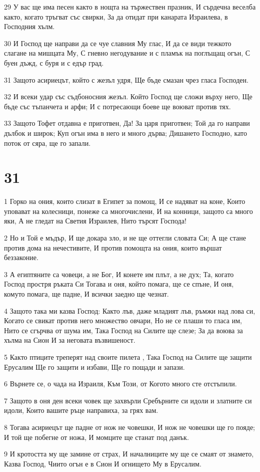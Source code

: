\par 29 У вас ще има песен както в нощта на тържествен празник, И сърдечна веселба както, когато тръгват със свирки, За да отидат при канарата Израилева, в Господния хълм.
\par 30 И Господ ще направи да се чуе славния Му глас, И да се види тежкото слагане на мишцата Му, С гневно негодувание и с пламък на поглъщащ огън, С буен дъжд, с буря и с едър град.
\par 31 Защото асириецът, който с жезъл удря, Ще бъде смазан чрез гласа Господен.
\par 32 И всеки удар със съдбоносния жезъл. Който Господ ще сложи върху него, Ще бъде със тъпанчета и арфи; И с потресающи боеве ще воюват против тях.
\par 33 Защото Тофет отдавна е приготвен, Да! За царя приготвен; Той да го направи дълбок и широк; Куп огън има в него и много дърва; Дишането Господно, като поток от сяра, ще го запали.

\chapter{31}

\par 1 Горко на ония, които слизат в Египет за помощ, И се надяват на коне, Които уповават на колесници, понеже са многочислени, И на конници, защото са много яки, А не гледат на Светия Израилев, Нито търсят Господа!
\par 2 Но и Той е мъдър, И ще докара зло, и не ще оттегли словата Си; А ще стане против дома на нечестивите, И против помощта на ония, които вършат беззаконие.
\par 3 А египтяните са човеци, а не Бог, И конете им плът, а не дух; Та, когато Господ простря ръката Си Тогава и оня, който помага, ще се спъне, И оня, комуто помага, ще падне, И всички заедно ще чезнат.
\par 4 Защото така ми казва Господ: Както лъв, даже младият лъв, ръмжи над лова си, Когато се свикат против него множество овчари, Но не се плаши то гласа им, Нито се сгърчва от шума им, Така Господ на Силите ще слезе; За да воюва за хълма на Сион И за неговата възвишеност.
\par 5 Както птиците треперят над своите пилета , Така Господ на Силите ще защити Ерусалим Ще го защити и избави, Ще го пощади и запази.
\par 6 Върнете се, о чада на Израиля, Към Този, от Когото много сте отстъпили.
\par 7 Защото в оня ден всеки човек ще захвърли Сребърните си идоли и златните си идоли, Които вашите ръце направиха, за грях вам.
\par 8 Тогава асириецът ще падне от нож не човешки, И нож не човешки ще го пояде; И той ще побегне от ножа, И момците ще станат под данък.
\par 9 И кротостта му ще замине от страх, И началниците му ще се смаят от знамето, Казва Господ, Чиито огън е в Сион И огнището Му в Ерусалим.

